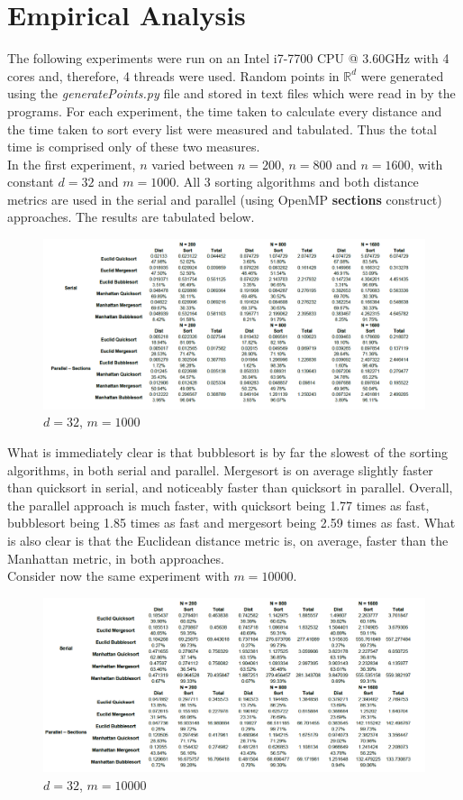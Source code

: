 \documentclass[10pt]{article}
\begin{document}
\section{Empirical Analysis}
The following experiments were run on an Intel i7-7700 CPU @ 3.60GHz with 4 cores and, therefore, 4 threads were used. Random points in $\mathbb{R}^{d}$ were generated using the \textit{generatePoints.py} file and stored in text files which were read in by the programs. For each experiment, the time taken to calculate every distance and the time taken to sort every list were measured and tabulated. Thus the total time is comprised only of these two measures.
\\
In the first experiment, $n$ varied between $n = 200$, $n = 800$ and $n = 1600$, with constant $d = 32$ and $m = 1000$. All 3 sorting algorithms and both distance metrics are used in the serial and parallel (using OpenMP \textbf{sections} construct) approaches. The results are tabulated below.
\begin{figure}[H]
\caption{$d = 32$, $m = 1000$}
\centering
\includegraphics[scale=0.5]{d32m1000.png}
\end{figure}
What is immediately clear is that bubblesort is by far the slowest of the sorting algorithms, in both serial and parallel. Mergesort is on average slightly faster than quicksort in serial, and noticeably faster than quicksort in parallel. Overall, the parallel approach is much faster, with quicksort being 1.77 times as fast, bubblesort being 1.85 times as fast and mergesort being 2.59 times as fast. What is also clear is that the Euclidean distance metric is, on average, faster than the Manhattan metric, in both approaches.
\\
Consider now the same experiment with $m=10 000$.
\begin{figure}[H]
\caption{$d = 32$, $m = 10000$}
\centering
\includegraphics[scale=0.5]{d32m10000.png}
\end{figure}
\end{document}
